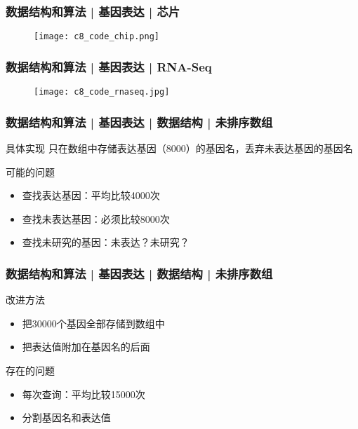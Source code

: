 \begin{frame}
  \frametitle{数据结构和算法 | 基因表达 | 芯片}
  \begin{figure}
    \centering
    \texttt{[image: c8\_code\_chip.png]}
  \end{figure}
\end{frame}

\begin{frame}
  \frametitle{数据结构和算法 | 基因表达 | RNA-Seq}
  \begin{figure}
    \centering
    \texttt{[image: c8\_code\_rnaseq.jpg]}
  \end{figure}
\end{frame}

\begin{frame}
  \frametitle{数据结构和算法 | 基因表达 | 数据结构 | 未排序数组}
  \begin{block}{具体实现}
    只在数组中存储表达基因（8000）的基因名，丢弃未表达基因的基因名
  \end{block}
  \pause
  \begin{block}{可能的问题}
    \begin{itemize}
      \item 查找表达基因：平均比较4000次
      \item 查找未表达基因：必须比较8000次
      \item 查找未研究的基因：未表达？未研究？
    \end{itemize}
  \end{block}
\end{frame}

\begin{frame}
  \frametitle{数据结构和算法 | 基因表达 | 数据结构 | 未排序数组}
  \begin{block}{改进方法}
    \begin{itemize}
      \item 把30000个基因全部存储到数组中
      \item 把表达值附加在基因名的后面
    \end{itemize}
  \end{block}
  \pause
  \begin{block}{存在的问题}
    \begin{itemize}
      \item 每次查询：平均比较15000次
      \item 分割基因名和表达值
    \end{itemize}
  \end{block}
\end{frame}

